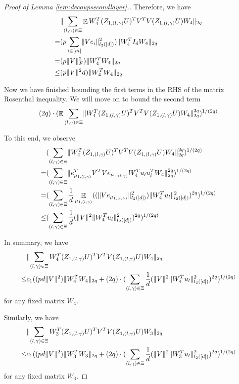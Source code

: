 \documentclass[11pt]{amsart}
\numberwithin{equation}{section}
\numberwithin{equation}{section}
\DeclareMathOperator{\E}{\mathbb{E}}
\DeclarePairedDelimiter{\norm}{\lVert}{\rVert}
\begin{document}
\begin{proof}[Proof of Lemma \ref{lem:decoupsecondlayer}.]
Therefore, we have
\begin{align*}
    &\norm{\sum \limits_{(l,\gamma) \in \Xi}\E W_4^T(Z_{1,(l,\gamma)}U)^TV^TV(Z_{1,(l,\gamma)}U)W_4}_{2q}\\=&(p\sum \limits_{i \in [m]}\norm{Ve_{i}}^2_{l_2([d])})\norm{W_4^T I_d W_4}_{2q}
    \\=&(p\norm{V}_{F}^2)\norm{W_4^TW_4}_{2q}
    \\ \le &(p\norm{V}^2d)\norm{W_4^TW_4}_{2q}
\end{align*}


Now we have finished bounding the first terms in the RHS of the matrix Rosenthal inequality. We will move on to bound the second term
\begin{align*}
    (2q)\cdot (\E \sum \limits_{(l,\gamma) \in \Xi} \norm{W_4^T(Z_{1,(l,\gamma)}U)^TV^TV(Z_{1,(l,\gamma)}U)W_4}_{2q}^{2q})^{1/(2q)}
\end{align*}

To this end, we observe
\begin{align*}
    &(\sum \limits_{(l,\gamma) \in \Xi} \norm{W_4^T(Z_{1,(l,\gamma)}U)^TV^TV(Z_{1,(l,\gamma)}U)W_4}_{2q}^{2q})^{1/(2q)}
    \\ = &(\sum \limits_{(l,\gamma) \in \Xi} \norm{e_{\mu_{1,(l,\gamma)}}^TV^TVe_{\mu_{1,(l,\gamma)}}W_4^Tu_lu_l^TW_4}_{2q}^{2q})^{1/(2q)}
    \\ = & (\sum\limits_{(l,\gamma) \in \Xi}\frac{1}{d}\E_{\mu_{1,(l,\gamma)}}((\norm{Ve_{\mu_{1,(l,\gamma)}}}_{l_2([d])}^2)\norm{W_4^Tu_l}_{l_2([d])}^{2})^{2q})^{1/(2q)}
    \\ \le & (\sum\limits_{(l,\gamma) \in \Xi}\frac{1}{d}(\norm{V}^2\norm{W_4^Tu_l}_{l_2([d])}^{2})^{2q})^{1/(2q)}
\end{align*}

In summary, we have
\begin{align*}
    &\norm{\sum \limits_{(l,\gamma) \in \Xi}W_4^T(Z_{1,(l,\gamma)}U)^TV^TV(Z_{1,(l,\gamma)}U)W_4}_{2q}  \\\le& c_1 ((pd\norm{V}^2)\norm{W_4^TW_4}_{2q}+(2q)\cdot (\sum\limits_{(l,\gamma) \in \Xi}\frac{1}{d}(\norm{V}^2\norm{W_4^Tu_l}_{l_2([d])}^{2})^{2q})^{1/(2q)}
\end{align*}
for any fixed matrix $W_4$.

Similarly, we have
\begin{align*}
    &\norm{\sum \limits_{(l,\gamma) \in \Xi}W_3^T(Z_{1,(l,\gamma)}U)^TV^TV(Z_{1,(l,\gamma)}U)W_3}_{2q}  \\\le& c_1 ((pd\norm{V}^2)\norm{W_3^TW_3}_{2q}+(2q)\cdot (\sum\limits_{(l,\gamma) \in \Xi}\frac{1}{d}(\norm{V}^2\norm{W_3^Tu_l}_{l_2([d])}^{2})^{2q})^{1/(2q)}
\end{align*}
for any fixed matrix $W_3$.


\end{proof}
\end{document}
